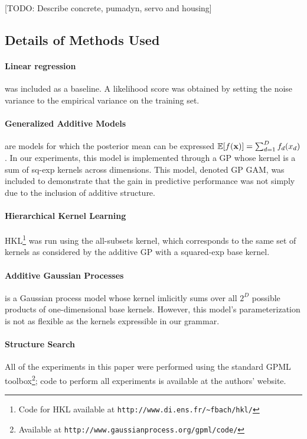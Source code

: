 \documentclass[twoside]{article}
\begin{document}
[TODO: Describe concrete, pumadyn, servo and housing]

\subsection{Details of Methods Used}

\paragraph{Linear regression} was included as a baseline. A likelihood score was obtained by setting the noise variance to the empirical variance on the training set.

\paragraph{Generalized Additive Models} are models for which the posterior mean can be expressed $\mathbb{E}[f({\bf{x}})] = \sum_{d=1}^D f_d(x_d)$.  
In our experiments, this model is implemented through a GP whose kernel is a sum of sq-exp kernels across dimensions.  
This model, denoted GP GAM, was included to demonstrate that the gain in predictive performance was not simply due to the inclusion of additive structure.

\paragraph{Hierarchical Kernel Learning}	
HKL\footnote{Code for HKL available at \texttt{http://www.di.ens.fr/\textasciitilde fbach/hkl/}} was run using the all-subsets kernel, which corresponds to the same set of kernels as considered by the additive GP with a squared-exp base kernel.

\paragraph{Additive Gaussian Processes} \cite{duvenaud2011additive11} is a Gaussian process model whose kernel imlicitly sums over all $2^D$ possible products of one-dimensional base kernels.  
However, this model's parameterization is not as flexible as the kernels expressible in our grammar.

\paragraph{Structure Search}
All of the experiments in this paper were performed using the standard GPML toolbox\footnote{Available at \texttt{http://www.gaussianprocess.org/gpml/code/}}; code to perform all experiments is available at the authors' website.
\end{document}
